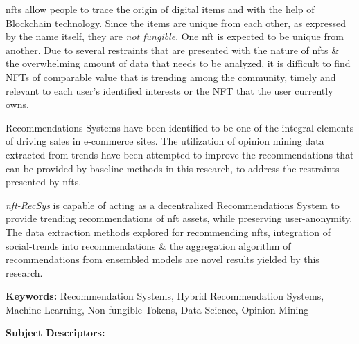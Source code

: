 
\gls{nft}s allow people to trace the origin of digital items and with the help of Blockchain technology. Since the items are unique from each other, as expressed by the name itself, they are \textit{not fungible}. One \gls{nft} is expected to be unique from another. 
Due to several restraints that are presented with the nature of \gls{nft}s \& the overwhelming amount of data that needs to be analyzed, it is difficult to find NFTs of comparable value that is trending among the community, timely and relevant to each user’s identified interests or the NFT that the user currently owns.

Recommendations Systems have been identified to be one of the integral elements of driving sales in e-commerce sites. The utilization of opinion mining data extracted from trends have been attempted to improve the recommendations that can be provided by baseline methods in this research, to address the restraints presented by \gls{nft}s.

\textit{\gls{nft}-RecSys} is capable of acting as a decentralized Recommendations System to provide trending recommendations of \gls{nft} assets, while preserving user-anonymity. The data extraction methods explored for recommending \gls{nft}s, integration of social-trends into recommendations \& the aggregation algorithm of recommendations from ensembled models are novel results yielded by this research.

\bigbreak
\noindent\textbf{Keywords:} Recommendation Systems, Hybrid Recommendation Systems, Machine Learning, Non-fungible Tokens, Data Science, Opinion Mining

\bigbreak
\noindent\textbf{Subject Descriptors:}

